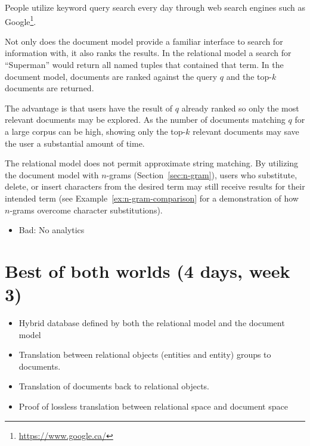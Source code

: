 		People utilize keyword query search every day through web search engines such as Google\footnote{\url{https://www.google.ca/}}.
		
		Not only does the document model provide a familiar interface to search for information with, it also ranks the results.  In the relational model a search for ``Superman'' would return all named tuples that contained that term.  In the document model, documents are ranked against the query $q$ and the top-$k$ documents are returned.
		
		The advantage is that users have the result of $q$ already ranked so only the most relevant documents may be explored.  As the number of documents matching $q$ for a large corpus can be high, showing only the top-$k$ relevant documents may save the user a substantial amount of time.
		
		The relational model does not permit approximate string matching.  By utilizing the document model with $n$-grams (Section~\ref{sec:n-gram}), users who substitute, delete, or insert characters from the desired term may still receive results for their intended term (see Example~\ref{ex:n-gram-comparison} for a demonstration of how $n$-grams overcome character substitutions).
		
	\begin{itemize}
		\item Bad: No analytics
	\end{itemize}
		
\section{Best of both worlds (4 days, week 3)}
	\begin{itemize}
		\item Hybrid database defined by both the relational model and the document model
		\item Translation between relational objects (entities and entity) groups to documents.
		\item Translation of documents back to relational objects.
		\item Proof of lossless translation between relational space and document space
	\end{itemize}